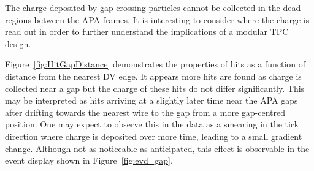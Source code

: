 The charge deposited by gap-crossing particles cannot be collected in the dead regions between the APA frames.  It is interesting to consider where the charge is read out in order to further understand the implications of a modular TPC design.

Figure~\ref{fig:HitGapDistance} demonstrates the properties of hits as a function of distance from the nearest DV edge.  It appears more hits are found as charge is collected near a gap but the charge of these hits do not differ significantly.  This may be interpreted as hits arriving at a slightly later time near the APA gaps after drifting towards the nearest wire to the gap from a more gap-centred position.  One may expect to observe this in the data as a smearing in the tick direction where charge is deposited over more time, leading to a small gradient change.  Although not as noticeable as anticipated, this effect is observable in the event display shown in Figure~\ref{fig:evd_gap}.

